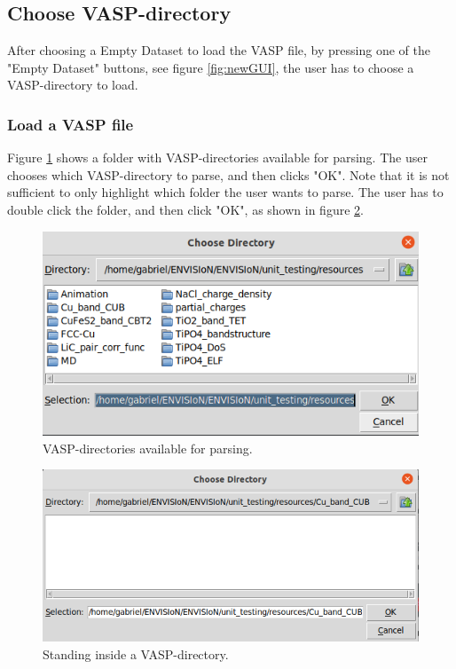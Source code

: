 \subsection{Choose VASP-directory}
After choosing a Empty Dataset to load the VASP file, by pressing one of the "Empty Dataset" buttons, see figure \ref{fig:newGUI}, the user has to choose a VASP-directory to load. \newline \newline 

\subsubsection{Load a VASP file}
Figure \ref{fig:newGUI_resources} shows a folder with VASP-directories available for parsing. The user chooses which VASP-directory to parse, and then clicks "OK". Note that it is not sufficient to only highlight which folder the user wants to parse. The user has to double click the folder, and then click "OK", as shown in figure \ref{fig:newGUI_VASPdir}.

\begin{figure}[H]
    \centering
    \includegraphics[scale = 0.56]{Images/newGUI_resources.png}
    \caption{VASP-directories available for parsing.}
    \label{fig:newGUI_resources}
\end{figure}

\begin{figure}[H]
    \centering
    \includegraphics[scale = 0.56]{Images/newGUI_VASPdir.png}
    \caption{Standing inside a VASP-directory.}
    \label{fig:newGUI_VASPdir}
\end{figure}

